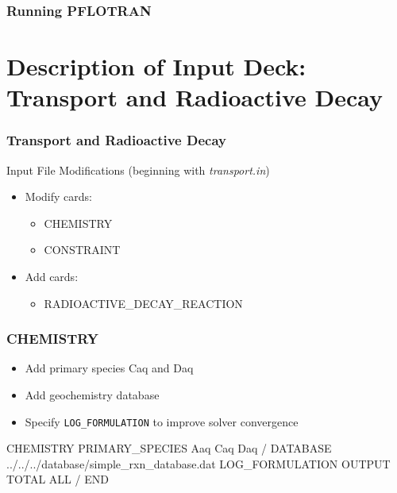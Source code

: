 \documentclass{beamer}
\newcommand\magentacomment[1]{{{\color{magenta} #1}}}
\begin{document}
\begin{frame}[fragile]\frametitle{Running PFLOTRAN}


\end{frame}

\section{Description of Input Deck: Transport and Radioactive Decay}

\begin{frame}[fragile]\frametitle{Transport and Radioactive Decay}

Input File Modifications (beginning with \textit{transport.in})
\begin{itemize}
\item Modify cards:
  \begin{itemize}
    \item CHEMISTRY
    \item CONSTRAINT
   \end{itemize}
\item Add cards:
  \begin{itemize}
    \item RADIOACTIVE\_DECAY\_REACTION
  \end{itemize}
\end{itemize}

\end{frame}

\begin{frame}\frametitle{CHEMISTRY}

\begin{itemize}
  \item Add primary species Caq and Daq
  \item Add geochemistry database
  \item Specify \verb|LOG_FORMULATION| to improve solver convergence
\end{itemize}

\begin{semiverbatim}
CHEMISTRY
  PRIMARY_SPECIES
    Aaq
    \magentacomment{Caq}
    \magentacomment{Daq}
  /
  \magentacomment{DATABASE ../../../database/simple_rxn_database.dat}
  \magentacomment{LOG_FORMULATION}
  OUTPUT
    TOTAL
    ALL
  /
END
\end{semiverbatim}

\end{frame}
\end{document}
